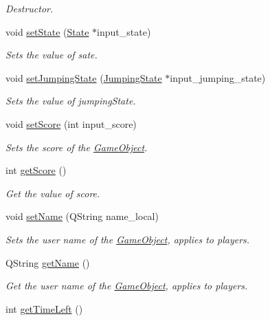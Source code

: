\begin{DoxyCompactItemize}
\begin{DoxyCompactList}\small\item\em Destructor. \end{DoxyCompactList}\item 
void \hyperlink{classGameObject_ae6c3730fbfc5fea46106466166177460}{set\-State} (\hyperlink{classState}{State} $\ast$input\-\_\-state)
\begin{DoxyCompactList}\small\item\em Sets the value of sate. \end{DoxyCompactList}\item 
void \hyperlink{classGameObject_a39aa8c311f514b871e6781bb076d8fdd}{set\-Jumping\-State} (\hyperlink{classJumpingState}{Jumping\-State} $\ast$input\-\_\-jumping\-\_\-state)
\begin{DoxyCompactList}\small\item\em Sets the value of jumping\-State. \end{DoxyCompactList}\item 
void \hyperlink{classGameObject_a23073437c24792019aac0b0663e93508}{set\-Score} (int input\-\_\-score)
\begin{DoxyCompactList}\small\item\em Sets the score of the \hyperlink{classGameObject}{Game\-Object}. \end{DoxyCompactList}\item 
int \hyperlink{classGameObject_a3bca3bee655746fb126bae49968d57fb}{get\-Score} ()
\begin{DoxyCompactList}\small\item\em Get the value of score. \end{DoxyCompactList}\item 
void \hyperlink{classGameObject_a9ecb58bea379eeb1d0b973b743861bf1}{set\-Name} (Q\-String name\-\_\-local)
\begin{DoxyCompactList}\small\item\em Sets the user name of the \hyperlink{classGameObject}{Game\-Object}, applies to players. \end{DoxyCompactList}\item 
Q\-String \hyperlink{classGameObject_a2dd3ed6457725c3b4730e93dd070f927}{get\-Name} ()
\begin{DoxyCompactList}\small\item\em Get the user name of the \hyperlink{classGameObject}{Game\-Object}, applies to players. \end{DoxyCompactList}\item 
int \hyperlink{classGameObject_a12af00f8b80f69e679e00c75b237a11c}{get\-Time\-Left} ()

\end{DoxyCompactItemize}
